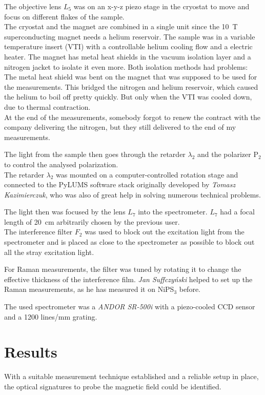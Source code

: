 \documentclass[
	oneside,
	parskip=half,
	a4paper,
]{scrbook}
\begin{document}
The objective lens $L_5$ was on an x-y-z piezo stage in the cryostat to move and focus on different flakes of the sample.\\
The cryostat and the magnet are combined in a single unit since the \SI{10}{T} superconducting magnet needs a helium reservoir.
The sample was in a variable temperature insert (VTI) with a controllable helium cooling flow and a electric heater.
The magnet has metal heat shields in the vacuum isolation layer and a nitrogen jacket to isolate it even more.
Both isolation methods had problems:\\
The metal heat shield was bent on the magnet that was supposed to be used for the measurements.
This bridged the nitrogen and helium reservoir, which caused the helium to boil off pretty quickly.
But only when the VTI was cooled down, due to thermal contraction.\\
At the end of the measurements, somebody forgot to renew the contract with the company delivering the nitrogen, but they still delivered to the end of my measurements.

The light from the sample then goes through the retarder $\lambda_2$ and the polarizer P$_2$ to control the analysed polarization.\\
The retarder $\lambda_2$ was mounted on a computer-controlled rotation stage and connected to the PyLUMS software stack originally developed by \textit{Tomasz Kazimierczuk}, who was also of great help in solving numerous technical problems.

The light then was focused by the lens $L_7$ into the spectrometer.
$L_7$ had a focal length of \SI{20}{cm} arbitrarily chosen by the previous user.\\
The interference filter $F_2$ was used to block out the excitation light from the spectrometer and is placed as close to the spectrometer as possible to block out all the stray excitation light.

For Raman measurements, the filter was tuned by rotating it to change the effective thickness of the interference film.
\textit{Jan Suffczyński} helped to set up the Raman measurements, as he has measured it on NiPS$_3$ before. 

The used spectrometer was a \textit{ANDOR SR-500i} with a piezo-cooled CCD sensor and a 1200 lines/mm grating.


\chapter{Results}
With a suitable measurement technique established and a reliable setup in place, the optical signatures to probe the magnetic field could be identified.
\end{document}
